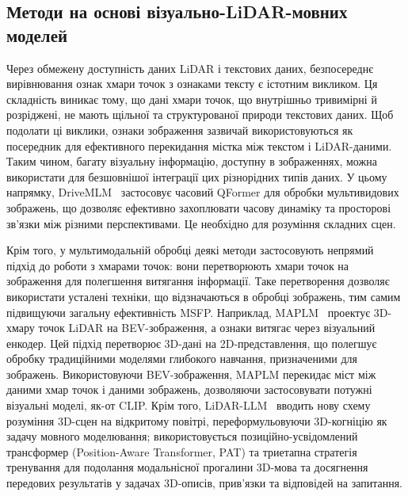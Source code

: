 \subsection{Методи на основі візуально-LiDAR-мовних моделей}

Через обмежену доступність даних LiDAR і текстових даних, безпосереднє вирівнювання ознак хмари точок з ознаками тексту є істотним викликом. Ця складність виникає тому, що дані хмари точок, що внутрішньо тривимірні й розріджені, не мають щільної та структурованої природи текстових даних. Щоб подолати ці виклики, ознаки зображення зазвичай використовуються як посередник для ефективного перекидання містка між текстом і LiDAR-даними.
Таким чином, багату візуальну інформацію, доступну в зображеннях, можна використати для безшовнішої інтеграції цих різнорідних типів даних.
У цьому напрямку,
DriveMLM~\cite{wang2023drivemlm} застосовує часовий QFormer для обробки мультивидових зображень, що дозволяє ефективно захоплювати часову динаміку та просторові зв'язки між різними перспективами. Це необхідно для розуміння складних сцен.

Крім того, у мультимодальній обробці деякі методи застосовують непрямий підхід до роботи з хмарами точок: вони перетворюють хмари точок на зображення для полегшення витягання інформації.
Таке перетворення дозволяє використати усталені техніки, що відзначаються в обробці зображень, тим самим підвищуючи загальну ефективність MSFP.
Наприклад, MAPLM~\cite{cao2024maplm} проектує 3D-хмару точок LiDAR на BEV-зображення, а ознаки витягає через візуальний енкодер.
Цей підхід перетворює 3D-дані на 2D-представлення, що полегшує обробку традиційними моделями глибокого навчання, призначеними для зображень. Використовуючи BEV-зображення, MAPLM перекидає міст між даними хмар точок і даними зображень, дозволяючи застосовувати потужні візуальні моделі, як-от CLIP.
Крім того, LiDAR-LLM~\cite{yang2025lidar} вводить нову схему розуміння 3D-сцен на відкритому повітрі, переформульовуючи 3D-когніцію як задачу мовного моделювання; використовується позиційно-усвідомлений трансформер (Position-Aware Transformer, PAT) та триетапна стратегія тренування для подолання модальнісної прогалини 3D-мова та досягнення передових результатів у задачах 3D-описів, прив'язки та відповідей на запитання.
